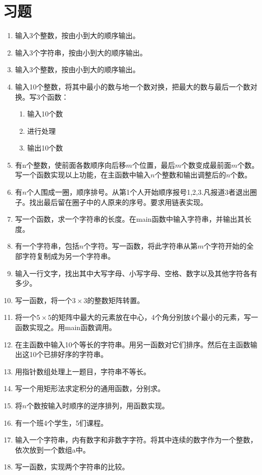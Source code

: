 \section{习题}
\begin{enumerate}
	\item 输入3个整数，按由小到大的顺序输出。
	\item 输入3个字符串，按由小到大的顺序输出。
	\item 输入3个整数，按由小到大的顺序输出。
	\item 输入10个整数，将其中最小的数与地一个数对换，把最大的数与最后一个数对换。写3个函数：
		\begin{enumerate}
			\item 输入10个数
			\item 进行处理
			\item 输出10个数
		\end{enumerate}
	\item 有n个整数，使前面各数顺序向后移$m$个位置，最后$m$个数变成最前面$m$个数。写一个函数实现以上功能，在主函数中输入$n$个整数和输出调整后的$n$个数。
	\item 有$n$个人围成一圈，顺序排号。从第1个人开始顺序报号1,2,3.凡报道3者退出圈子。找出最后留在圈子中的人原来的序号。要求用链表实现。
	\item 写一个函数，求一个字符串的长度。在main函数中输入字符串，并输出其长度。
	\item 有一个字符串，包括$n$个字符。写一函数，将此字符串从第$m$个字符开始的全部字符复制成为另一个字符串。
	\item 输入一行文字，找出其中大写字母、小写字母、空格、数字以及其他字符各有多少。
	\item 写一函数，将一个$3 \times 3$的整数矩阵转置。
	\item 将一个$5 \times 5$的矩阵中最大的元素放在中心，4个角分别放4个最小的元素，写一函数实现之。用main函数调用。
	\item 在主函数中输入10个等长的字符串。用另一函数对它们排序。然后在主函数输出这10个已排好序的字符串。
	\item 用指针数组处理上一题目，字符串不等长。
	\item 写一个用矩形法求定积分的通用函数，分别求。
	\item 将$n$个数按输入时顺序的逆序排列，用函数实现。
	\item 有一个班4个学生，5们课程。
	\item 输入一个字符串，内有数字和非数字字符。将其中连续的数字作为一个整数，依次放到一个数组a中。
	\item 写一函数，实现两个字符串的比较。

\end{enumerate}
